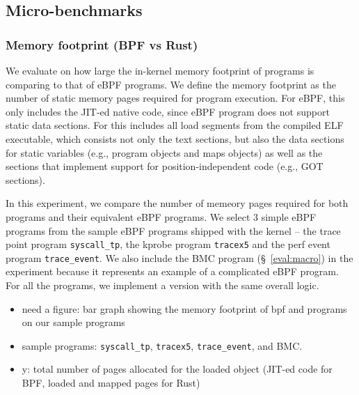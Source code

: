 \subsection{Micro-benchmarks}
\subsubsection{Memory footprint (BPF vs Rust)}
We evaluate on how large the in-kernel memory footprint of \projname{} programs
    is comparing to that of eBPF programs.
We define the memory footprint as the number of static memory pages required
    for program execution.
For eBPF, this only includes the JIT-ed native code, since eBPF program does
    not support static data sections.
For \projname{} this includes all load segments from the compiled ELF
    executable, which consists not only the text sections, but also the data
    sections for static variables (e.g., program objects and maps objects) as
    well as the sections that implement support for position-independent code
    (e.g., GOT sections).

In this experiment, we compare the number of memeory pages required for both
    \projname{} programs and their equivalent eBPF programs.
We select 3 simple eBPF programs from the sample eBPF programs shipped with the
    kernel -- the trace point program \texttt{syscall\_tp}, the kprobe program
    \texttt{tracex5} and the perf event program \texttt{trace\_event}.
We also include the BMC program (\S~\ref{eval:macro}) in the experiment because
    it represents an example of a complicated eBPF program.
For all the programs, we implement a \projname{} version with the same
    overall logic.

\begin{itemize}
    \item need a figure: bar graph showing the memory footprint of bpf and
        \projname{} programs on our sample programs
    \item sample programs: \texttt{syscall\_tp}, \texttt{tracex5},
        \texttt{trace\_event}, and BMC.
    \item y: total number of pages allocated for the loaded object (JIT-ed code
        for BPF, loaded and mapped pages for Rust)
\end{itemize}


